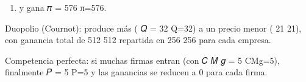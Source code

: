 \documentclass[
]{article}
\providecommand{\tightlist}{%
  \setlength{\itemsep}{0pt}\setlength{\parskip}{0pt}}
\begin{document}
\begin{enumerate}
\def\labelenumi{\arabic{enumi})}
\setcounter{enumi}{28}
\tightlist
\item
  y gana 𝜋 = 576 π=576.
\end{enumerate}

Duopolio (Cournot): produce más ( 𝑄 = 32 Q=32) a un precio menor ( 21
21), con ganancia total de 512 512 repartida en 256 256 para cada
empresa.

Competencia perfecta: si muchas firmas entran (con 𝐶 𝑀 𝑔 = 5 CMg=5),
finalmente 𝑃 = 5 P=5 y las ganancias se reducen a 0 para cada firma.
\end{document}
